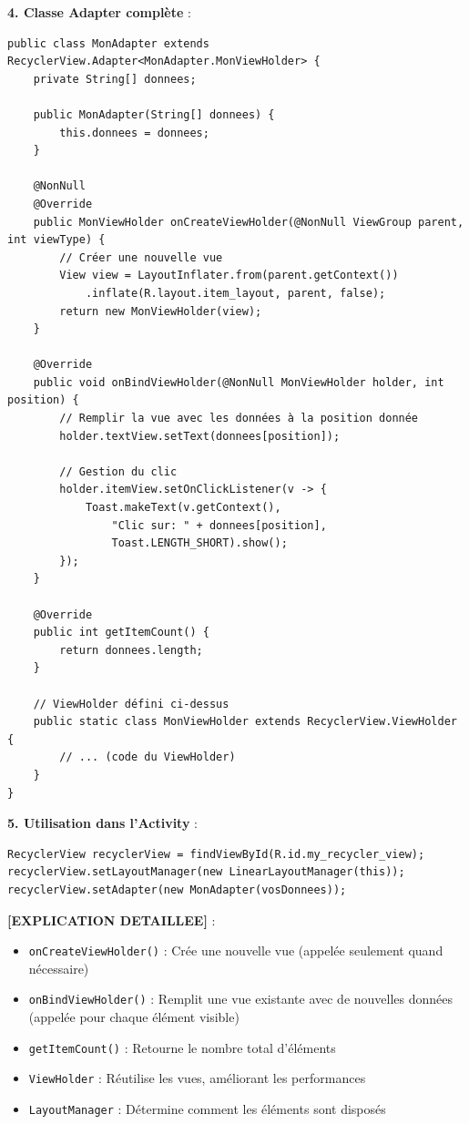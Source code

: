 \documentclass[11pt,a4paper]{article}
\begin{document}
\textbf{4. Classe Adapter complète} :
\begin{lstlisting}
public class MonAdapter extends RecyclerView.Adapter<MonAdapter.MonViewHolder> {
    private String[] donnees;
    
    public MonAdapter(String[] donnees) { 
        this.donnees = donnees; 
    }
    
    @NonNull
    @Override
    public MonViewHolder onCreateViewHolder(@NonNull ViewGroup parent, int viewType) {
        // Créer une nouvelle vue
        View view = LayoutInflater.from(parent.getContext())
            .inflate(R.layout.item_layout, parent, false);
        return new MonViewHolder(view);
    }
    
    @Override
    public void onBindViewHolder(@NonNull MonViewHolder holder, int position) {
        // Remplir la vue avec les données à la position donnée
        holder.textView.setText(donnees[position]);
        
        // Gestion du clic
        holder.itemView.setOnClickListener(v -> {
            Toast.makeText(v.getContext(), 
                "Clic sur: " + donnees[position], 
                Toast.LENGTH_SHORT).show();
        });
    }
    
    @Override
    public int getItemCount() { 
        return donnees.length; 
    }
    
    // ViewHolder défini ci-dessus
    public static class MonViewHolder extends RecyclerView.ViewHolder {
        // ... (code du ViewHolder)
    }
}
\end{lstlisting}

\textbf{5. Utilisation dans l'Activity} :
\begin{lstlisting}
RecyclerView recyclerView = findViewById(R.id.my_recycler_view);
recyclerView.setLayoutManager(new LinearLayoutManager(this));
recyclerView.setAdapter(new MonAdapter(vosDonnees));
\end{lstlisting}

\textbf{[EXPLICATION DETAILLEE]} :
\begin{itemize}
    \item \texttt{onCreateViewHolder()} : Crée une nouvelle vue (appelée seulement quand nécessaire)
    \item \texttt{onBindViewHolder()} : Remplit une vue existante avec de nouvelles données (appelée pour chaque élément visible)
    \item \texttt{getItemCount()} : Retourne le nombre total d'éléments
    \item \texttt{ViewHolder} : Réutilise les vues, améliorant les performances
    \item \texttt{LayoutManager} : Détermine comment les éléments sont disposés
\end{itemize}
\end{document}
